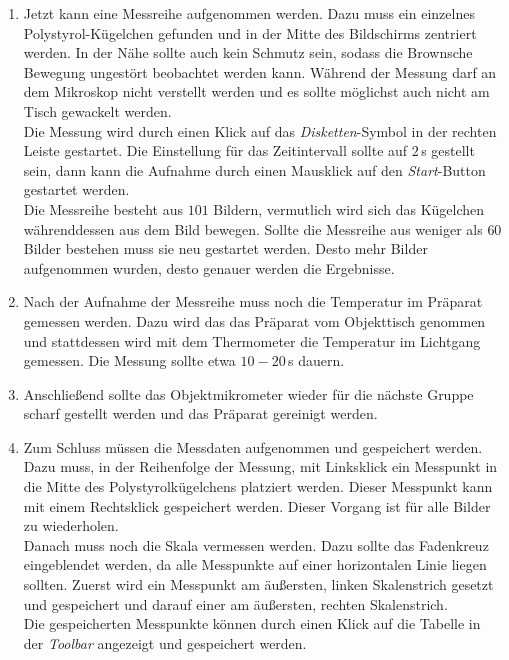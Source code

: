 \begin{enumerate}
  \item Jetzt kann eine Messreihe aufgenommen werden. Dazu muss ein einzelnes Polystyrol-Kügelchen gefunden und in der Mitte des Bildschirms zentriert werden. In der Nähe sollte auch kein Schmutz sein, sodass die Brownsche Bewegung ungestört beobachtet werden kann. Während der Messung darf an dem Mikroskop nicht verstellt werden und es sollte möglichst auch nicht am Tisch gewackelt werden.\\
  Die Messung wird durch einen Klick auf das \emph{Disketten}-Symbol in der rechten Leiste gestartet. Die Einstellung für das Zeitintervall sollte auf $2 \,$s gestellt sein, dann kann die Aufnahme durch einen Mausklick auf den \emph{Start}-Button gestartet werden.\\
  Die Messreihe besteht aus $101$ Bildern, vermutlich wird sich das Kügelchen währenddessen aus dem Bild bewegen. Sollte die Messreihe aus weniger als $60$ Bilder bestehen muss sie neu gestartet werden. Desto mehr Bilder aufgenommen wurden, desto genauer werden die Ergebnisse.

  \item Nach der Aufnahme der Messreihe muss noch die Temperatur im Präparat gemessen werden. Dazu wird das das Präparat vom Objekttisch genommen und stattdessen wird mit dem Thermometer die Temperatur im Lichtgang gemessen. Die Messung sollte etwa $10 - 20\,$s dauern.

  \item Anschließend sollte das Objektmikrometer wieder für die nächste Gruppe scharf gestellt werden und das Präparat gereinigt werden.

  \item Zum Schluss müssen die Messdaten aufgenommen und gespeichert werden. Dazu muss, in der Reihenfolge der Messung, mit Linksklick ein Messpunkt in die Mitte des Polystyrolkügelchens platziert werden. Dieser Messpunkt kann mit einem Rechtsklick gespeichert werden. Dieser Vorgang ist für alle Bilder zu wiederholen.\\
  Danach muss noch die Skala vermessen werden. Dazu sollte das Fadenkreuz eingeblendet werden, da alle Messpunkte auf einer horizontalen Linie liegen sollten. Zuerst wird ein Messpunkt am äußersten, linken Skalenstrich gesetzt und gespeichert und darauf einer am äußersten, rechten Skalenstrich.\\
  Die gespeicherten Messpunkte können durch einen Klick auf die Tabelle in der \emph{Toolbar} angezeigt und gespeichert werden.

\end{enumerate}
